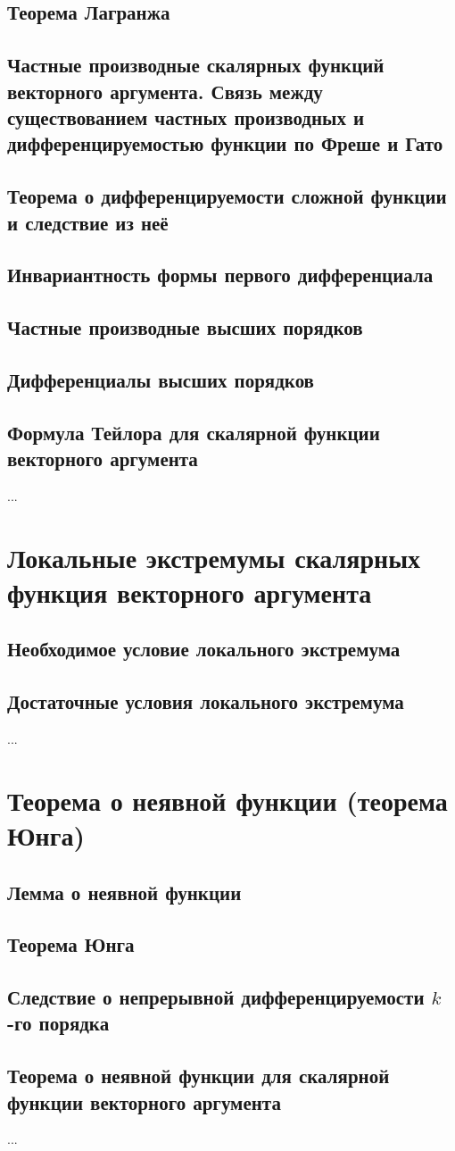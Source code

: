 \subsection{Теорема Лагранжа}
\subsection{Частные производные скалярных функций векторного аргумента. Связь между существованием частных производных и дифференцируемостью функции по Фреше и Гато}
\subsection{Теорема о дифференцируемости сложной функции и следствие из неё}
\subsection{Инвариантность формы первого дифференциала}
\subsection{Частные производные высших порядков}
\subsection{Дифференциалы высших порядков}
\subsection{Формула Тейлора для скалярной функции векторного аргумента}

...

\section{Локальные экстремумы скалярных функция векторного аргумента}
\subsection{Необходимое условие локального экстремума}
\subsection{Достаточные условия локального экстремума}
...

\section{Теорема о неявной функции (теорема Юнга)}
\subsection{Лемма о неявной функции}
\subsection{Теорема Юнга}
\subsection{Следствие о непрерывной дифференцируемости $k$-го порядка}
\subsection{Теорема о неявной функции для скалярной функции векторного аргумента}
...

